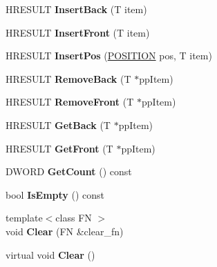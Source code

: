 \begin{DoxyCompactItemize}
\item 
\mbox{\label{class_list_af059b678f65802b5f5ed26e3197f64b8}} 
H\+R\+E\+S\+U\+LT {\bfseries Insert\+Back} (T item)
\item 
\mbox{\label{class_list_a8a4bd454a5410165db99ba4b46d50a95}} 
H\+R\+E\+S\+U\+LT {\bfseries Insert\+Front} (T item)
\item 
\mbox{\label{class_list_a55ca4fb03af02df3ef83376d7a018b00}} 
H\+R\+E\+S\+U\+LT {\bfseries Insert\+Pos} (\hyperlink{class_list_1_1_p_o_s_i_t_i_o_n}{P\+O\+S\+I\+T\+I\+ON} pos, T item)
\item 
\mbox{\label{class_list_a2ceb61f9af8232f1751a9586fdda07be}} 
H\+R\+E\+S\+U\+LT {\bfseries Remove\+Back} (T $\ast$pp\+Item)
\item 
\mbox{\label{class_list_afc49851537299dd55870b89ea4091414}} 
H\+R\+E\+S\+U\+LT {\bfseries Remove\+Front} (T $\ast$pp\+Item)
\item 
\mbox{\label{class_list_aa971f3c728fdbe1d56304924b69f8c1a}} 
H\+R\+E\+S\+U\+LT {\bfseries Get\+Back} (T $\ast$pp\+Item)
\item 
\mbox{\label{class_list_a4ad3db64802a425943292b7109c3d963}} 
H\+R\+E\+S\+U\+LT {\bfseries Get\+Front} (T $\ast$pp\+Item)
\item 
\mbox{\label{class_list_a646fe5cc396e2164ecbde538f03d8d07}} 
D\+W\+O\+RD {\bfseries Get\+Count} () const
\item 
\mbox{\label{class_list_a16e0b41c6ba00715dad1243b3cdb09c3}} 
bool {\bfseries Is\+Empty} () const
\item 
\mbox{\label{class_list_a16577ca93365303a1c943fbe79f312c6}} 
{\footnotesize template$<$class FN $>$ }\\void {\bfseries Clear} (FN \&clear\+\_\+fn)
\item 
\mbox{\label{class_list_ae58aeefe9c004caaa464719a0d9b49a8}} 
virtual void {\bfseries Clear} ()

\end{DoxyCompactItemize}
